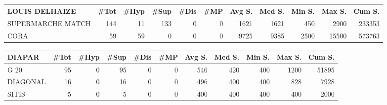 \documentclass[11pt]{article}
\begin{document}
\begin{table}[H]
\footnotesize
\setlength{\tabcolsep}{2pt}
\begin{tabular}{lrrrrrrrrrr}
\toprule
LOUIS DELHAIZE &       \#Tot &       \#Hyp &       \#Sup &       \#Dis &        \#MP &     Avg S. &     Med S. &     Min S. &     Max S. &     Cum S. \\
\midrule
SUPERMARCHE MATCH &        144 &         11 &        133 &          0 &          0 &       1621 &       1621 &        450 &       2900 &     233353 \\
CORA              &         59 &         59 &          0 &          0 &          0 &       9725 &       9385 &       2500 &      15500 &     573763 \\
\bottomrule
\end{tabular}
\end{table}

\begin{table}[H]
\footnotesize
\setlength{\tabcolsep}{2pt}
\begin{tabular}{lrrrrrrrrrr}
\toprule
DIAPAR &       \#Tot &       \#Hyp &       \#Sup &       \#Dis &        \#MP &     Avg S. &     Med S. &     Min S. &     Max S. &     Cum S. \\
\midrule
G 20     &         95 &          0 &         95 &          0 &          0 &        546 &        420 &        400 &       1200 &      51895 \\
DIAGONAL &         16 &          0 &         16 &          0 &          0 &        496 &        400 &        400 &        828 &       7928 \\
SITIS    &          5 &          0 &          5 &          0 &          0 &        400 &        400 &        400 &        400 &       2000 \\
\bottomrule
\end{tabular}

\end{table}
\end{document}
